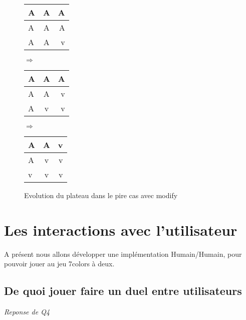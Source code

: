 \documentclass[a4paper,11pt]{article}
\begin{document}
\begin{figure}[!h]
\begin{center}
\begin{tabular}{ | l | c | r | }
	\hline
	A & A & A \\ 
	\hline
	A & A & A \\ 
	\hline
	A & A & \cellcolor{blue!25}v \\
	\hline
\end{tabular}
\hspace{1cm}
{\Huge
\begin{math}
\Rightarrow
\end{math}}
\hspace{1cm}
\begin{tabular}{ | l | c | r | }
	\hline
	A & A & A \\ 
	\hline
	A & A & \cellcolor{blue!25}v \\ 
	\hline
	A & \cellcolor{blue!25}v & \cellcolor{blue!25}v \\
	\hline
\end{tabular}
\hspace{1cm}
{\Huge
\begin{math}
\Rightarrow
\end{math}}
\hspace{1cm}
\begin{tabular}{ | l | c | r | }
	\hline
	A & A & \cellcolor{blue!25}v \\ 
	
	\hline
	A & \cellcolor{blue!25}v & \cellcolor{blue!25}v \\ 
	
	\hline
	
	\cellcolor{blue!25}v & \cellcolor{blue!25}v & \cellcolor{blue!25}v \\
	\hline
\end{tabular}
\end{center}
\caption{Evolution du plateau dans le pire cas avec modify}
\end{figure}



\section{Les interactions avec l'utilisateur}

A présent nous allons développer une implémentation Humain/Humain, pour 
pouvoir jouer au jeu 7colors à deux.

\subsection{De quoi jouer faire un duel entre utilisateurs}
\emph{Reponse de Q4}
\end{document}
